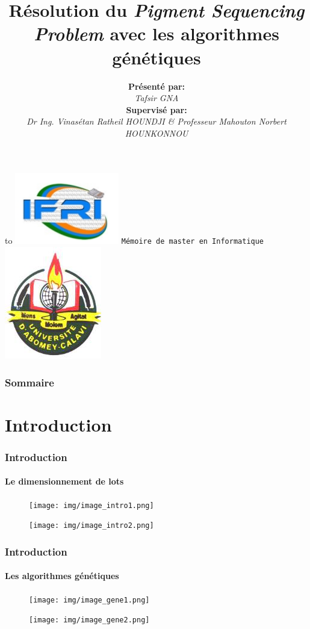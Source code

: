 \documentclass[11pt]{beamer}
\author{\textbf{Présenté par:} \\ \textit{Tafsir GNA} \\ \textbf{Supervisé par:} \\ \textit{Dr Ing. Vinasétan Ratheil HOUNDJI \& Professeur Mahouton Norbert HOUNKONNOU}}
\title{Résolution du \emph{Pigment Sequencing Problem} avec les algorithmes génétiques}
\begin{document}
 
 \begin{frame}
	\hbox to \textwidth
 	{
 		\includegraphics[scale=0.2]{img/ifri_logo.png}
 		\hfill
 		\texttt{Mémoire de master en Informatique}
 		\hfill
 		\includegraphics[scale=0.2]{img/uac_logo.png}
 	}
	\titlepage
\end{frame} 


 
 \begin{frame}
 \frametitle{Sommaire}
 \setcounter{tocdepth}{1}
 \tableofcontents
 \end{frame}

 \section{Introduction}
 \begin{frame}
 \frametitle{Introduction}
 \framesubtitle{Le dimensionnement de lots}
 	\begin{figure}
   \begin{minipage}[c]{.46\linewidth}
      \texttt{[image: img/image\_intro1.png]}
   \end{minipage} \hfill
   \begin{minipage}[c]{.46\linewidth}
      \texttt{[image: img/image\_intro2.png]}
   \end{minipage}
\end{figure}
 \end{frame} 
 
 \begin{frame}
 \frametitle{Introduction}
 \framesubtitle{Les algorithmes génétiques}
 	\begin{figure}
   \begin{minipage}[c]{.46\linewidth}
      \texttt{[image: img/image\_gene1.png]}
   \end{minipage} \hfill
   \begin{minipage}[c]{.46\linewidth}
      \texttt{[image: img/image\_gene2.png]}
   \end{minipage}
\end{figure}
 \end{frame} 
 
\end{document}
